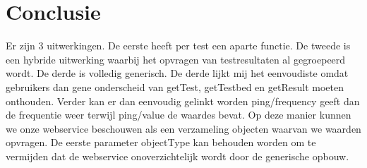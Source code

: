 \documentclass[11pt]{article}
\begin{document}
\section{Conclusie}
Er zijn 3 uitwerkingen. De eerste heeft per test een aparte functie.
De tweede is een hybride uitwerking waarbij het opvragen van testresultaten al gegroepeerd wordt. De derde is volledig generisch. De derde lijkt mij het eenvoudiste omdat gebruikers dan gene onderscheid van getTest, getTestbed en getResult moeten onthouden. Verder kan er dan eenvoudig gelinkt worden ping/frequency geeft dan de frequentie weer terwijl ping/value de waardes bevat. Op deze manier kunnen we onze webservice beschouwen als een verzameling objecten waarvan we waarden opvragen. De eerste parameter objectType kan behouden worden om te vermijden dat de webservice onoverzichtelijk wordt door de generische opbouw.
\end{document}
